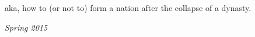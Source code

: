 aka, how to (or not to) form a nation after the collapse of a dynasty.

\begin{flushright}
\textit{Spring 2015}
\end{flushright}




\groupendnotes


